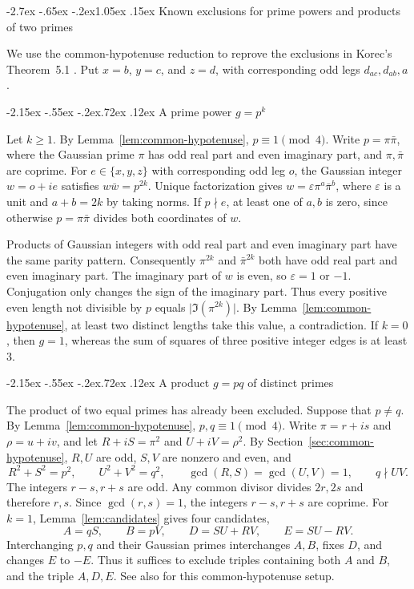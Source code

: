 \documentclass[11pt,a4paper,twoside]{article}
\makeatletter
\numberwithin{equation}{section}
\renewcommand{\section}{\@startsection{section}{1}{\z@}%
  {-2.7ex \@plus -.65ex \@minus -.2ex}{1.05ex \@plus .15ex}%
  {\normalfont\large\bfseries}}
\renewcommand{\subsection}{\@startsection{subsection}{2}{\z@}%
  {-2.15ex \@plus -.55ex \@minus -.2ex}{.72ex \@plus .12ex}%
  {\normalfont\normalsize\bfseries}}
\makeatother
\begin{document}
\section{Known exclusions for prime powers and products of two primes}
\label{sec:lower-diagonals}

We use the common-hypotenuse reduction to reprove the exclusions in Korec's Theorem~5.1 \cite{ref1}. Put \(x=b\), \(y=c\), and \(z=d\), with corresponding odd legs \(d_{ac},d_{ab},a\).

\subsection{A prime power \texorpdfstring{\(g=p^k\)}{g = pᵏ}}

Let \(k\ge1\). By Lemma~\ref{lem:common-hypotenuse}, \(p\equiv1\pmod 4\). Write \(p=\pi\bar\pi\), where the Gaussian prime \(\pi\) has odd real part and even imaginary part, and \(\pi,\bar\pi\) are coprime. For \(e\in\{x,y,z\}\) with corresponding odd leg \(o\), the Gaussian integer \(w=o+ie\) satisfies \(w\bar w=p^{2k}\). Unique factorization gives \(w=\varepsilon\pi^a\bar\pi^b\), where \(\varepsilon\) is a unit and \(a+b=2k\) by taking norms. If \(p\nmid e\), at least one of \(a,b\) is zero, since otherwise \(p=\pi\bar\pi\) divides both coordinates of \(w\).

Products of Gaussian integers with odd real part and even imaginary part have the same parity pattern. Consequently \(\pi^{2k}\) and \(\bar\pi^{2k}\) both have odd real part and even imaginary part. The imaginary part of \(w\) is even, so \(\varepsilon=1\) or \(-1\). Conjugation only changes the sign of the imaginary part. Thus every positive even length not divisible by \(p\) equals \(\lvert\Im(\pi^{2k})\rvert\). By Lemma~\ref{lem:common-hypotenuse}, at least two distinct lengths take this value, a contradiction. If \(k=0\), then \(g=1\), whereas the sum of squares of three positive integer edges is at least \(3\).

\subsection{A product \texorpdfstring{\(g=pq\)}{g = pq} of distinct primes}

The product of two equal primes has already been excluded. Suppose that \(p\ne q\). By Lemma~\ref{lem:common-hypotenuse}, \(p,q\equiv1\pmod 4\). Write \(\pi=r+is\) and \(\rho=u+iv\), and let \(R+iS=\pi^2\) and \(U+iV=\rho^2\). By Section~\ref{sec:common-hypotenuse}, \(R,U\) are odd, \(S,V\) are nonzero and even, and
\[
R^2+S^2=p^2,\qquad U^2+V^2=q^2,\qquad
\gcd(R,S)=\gcd(U,V)=1,\qquad q\nmid UV.
\]
The integers \(r-s,r+s\) are odd. Any common divisor divides \(2r,2s\) and therefore \(r,s\). Since \(\gcd(r,s)=1\), the integers \(r-s,r+s\) are coprime. For \(k=1\), Lemma~\ref{lem:candidates} gives four candidates,
\[
A=qS,\qquad B=pV,\qquad D=SU+RV,\qquad E=SU-RV.
\]
Interchanging \(p,q\) and their Gaussian primes interchanges \(A,B\), fixes \(D\), and changes \(E\) to \(-E\). Thus it suffices to exclude triples containing both \(A\) and \(B\), and the triple \(A,D,E\). See also \cite[Section~4]{ref2} for this common-hypotenuse setup.
\end{document}
